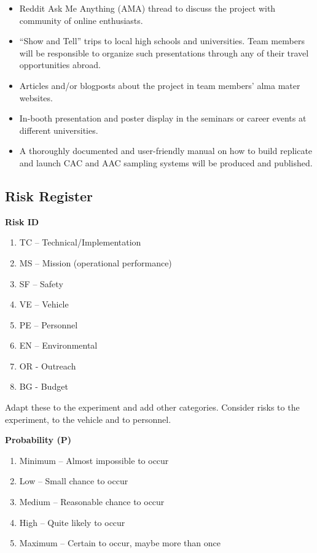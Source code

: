 \documentclass[a4paper,12pt,twoside]{article}
\begin{document}
\begin{itemize}
\item Reddit Ask Me Anything (AMA) thread to discuss the project with community of online enthusiasts.
\item\enquote{Show and Tell} trips to local high schools and universities. Team members will be responsible to organize such presentations through any of their travel opportunities abroad.
\item Articles and/or blogposts about the project in team members' alma mater websites.
\item In-booth presentation and poster display in the seminars or career events at different universities. 
\item A thoroughly documented and user-friendly manual on how to build replicate and launch CAC and AAC sampling systems will be produced and published.
\end{itemize}
\pagebreak
\subsection{Risk Register}
\textbf{Risk ID}
\begin{enumerate}[label={}]
    \item TC – Technical/Implementation 
    \item MS – Mission (operational performance) 
    \item SF – Safety 
    \item VE – Vehicle 
    \item PE – Personnel 
    \item EN – Environmental 
    \item OR - Outreach
    \item BG - Budget
\end{enumerate}

Adapt these to the experiment and add other categories. 
Consider risks to the experiment, to the vehicle and to personnel. 

\textbf{Probability (P)}
\begin{enumerate}[label=\Alph*]
    \item Minimum – Almost impossible to occur 
    \item Low – Small chance to occur 
    \item Medium – Reasonable chance to occur 
    \item High – Quite likely to occur 
    \item Maximum – Certain to occur, maybe more than once
\end{enumerate}
\end{document}
